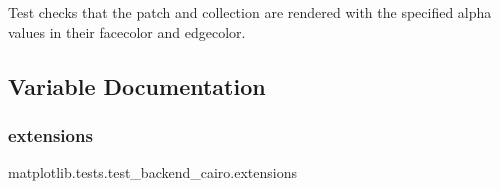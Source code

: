 \begin{DoxyVerb}Test checks that the patch and collection are rendered with the specified
alpha values in their facecolor and edgecolor.
\end{DoxyVerb}
 

\subsection{Variable Documentation}
\mbox{\label{namespacematplotlib_1_1tests_1_1test__backend__cairo_a26df0570f5ee7eae4b5768e372e13f2d}} 
\subsubsection{\texorpdfstring{extensions}{extensions}}
{\footnotesize\ttfamily matplotlib.\+tests.\+test\+\_\+backend\+\_\+cairo.\+extensions}

